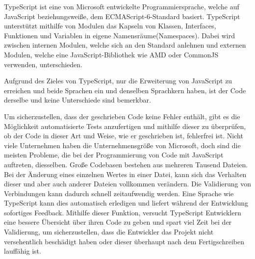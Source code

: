 \label{sec:TypeScript}

TypeScript ist eine von Microsoft entwickelte Programmiersprache, welche auf JavaScript beziehungsweiße, dem ECMAScript-6-Standard basiert. TypeScript unterstützt mithilfe von Modulen das Kapseln von Klassen, Interfaces, Funktionen und Variablen in eigene Namensräume(Namespaces). Dabei wird zwischen internen Modulen, welche sich an den Standard anlehnen und externen Modulen, welche eine JavaScript-Bibliothek wie AMD oder CommonJS verwenden, unterschieden.
\cite{TypeScript}



Aufgrund des Zieles von TypeScript, nur die Erweiterung von JavaScript zu erreichen und beide Sprachen ein und denselben Sprachkern haben, ist der Code derselbe und keine Unterschiede sind bemerkbar. 
\cite{TypeScript}


Um sicherzustellen, dass der geschrieben Code keine Fehler enthält, gibt es die Möglichkeit automatisierte Tests anzufertigen und mithilfe dieser zu überprüfen, ob der Code in dieser Art und Weise, wie er geschrieben ist, fehlerfrei ist.
Nicht viele Unternehmen haben die Unternehmensgröße von Microsoft, doch sind die meisten Probleme, die bei der Programmierung von Code mit JavaScript auftreten, diesselben. Große Codebasen bestehen aus mehreren Tausend Dateien. Bei der Änderung eines einzelnen Wertes in einer Datei, kann sich das Verhalten dieser und aber auch anderer Dateien vollkommen verändern.
Die Validierung von Verbindungen kann dadurch schnell zeitaufwendig werden. Eine Sprache wie TypeScript kann dies automatisch erledigen und liefert während der Entwicklung sofortiges Feedback. Mithilfe dieser Funktion, versucht TypeScript Entwicklern eine bessere Übersicht über ihren Code zu geben und spart viel Zeit bei der Validierung, um sicherzustellen, dass die Entwickler das Projekt nicht versehentlich beschädigt haben oder dieser überhaupt nach dem Fertigschreiben lauffähig ist.

\cite{ScriptWiki}
